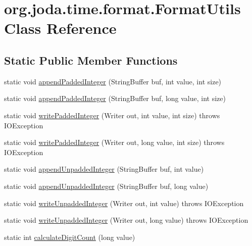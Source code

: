 \hypertarget{classorg_1_1joda_1_1time_1_1format_1_1_format_utils}{\section{org.\-joda.\-time.\-format.\-Format\-Utils Class Reference}
\label{classorg_1_1joda_1_1time_1_1format_1_1_format_utils}
}
\subsection*{Static Public Member Functions}
\begin{DoxyCompactItemize}
\item 
static void \hyperlink{classorg_1_1joda_1_1time_1_1format_1_1_format_utils_ad10b31a343d5187c4f8e2f0760bd4d1a}{append\-Padded\-Integer} (String\-Buffer buf, int value, int size)
\item 
static void \hyperlink{classorg_1_1joda_1_1time_1_1format_1_1_format_utils_a4d3dd2b342d7fc1e3d96c5ecf593ebd9}{append\-Padded\-Integer} (String\-Buffer buf, long value, int size)
\item 
static void \hyperlink{classorg_1_1joda_1_1time_1_1format_1_1_format_utils_a17122f540f3299ec7a02814200a7466a}{write\-Padded\-Integer} (Writer out, int value, int size)  throws I\-O\-Exception     
\item 
static void \hyperlink{classorg_1_1joda_1_1time_1_1format_1_1_format_utils_aec3f300576cee53e1669e17b9277b3b5}{write\-Padded\-Integer} (Writer out, long value, int size)  throws I\-O\-Exception     
\item 
static void \hyperlink{classorg_1_1joda_1_1time_1_1format_1_1_format_utils_ae552aec31c20d58d5faf298795ffa1aa}{append\-Unpadded\-Integer} (String\-Buffer buf, int value)
\item 
static void \hyperlink{classorg_1_1joda_1_1time_1_1format_1_1_format_utils_a7d9c3c085b0c260a162fe09a611a02e2}{append\-Unpadded\-Integer} (String\-Buffer buf, long value)
\item 
static void \hyperlink{classorg_1_1joda_1_1time_1_1format_1_1_format_utils_afe12e69ade941a851b4af532cff0bb92}{write\-Unpadded\-Integer} (Writer out, int value)  throws I\-O\-Exception     
\item 
static void \hyperlink{classorg_1_1joda_1_1time_1_1format_1_1_format_utils_a0cfc099172c712db8d6f8a090639d035}{write\-Unpadded\-Integer} (Writer out, long value)  throws I\-O\-Exception     
\item 
static int \hyperlink{classorg_1_1joda_1_1time_1_1format_1_1_format_utils_a7062f31ca630b94a11680a01fa345e0b}{calculate\-Digit\-Count} (long value)
\end{DoxyCompactItemize}


